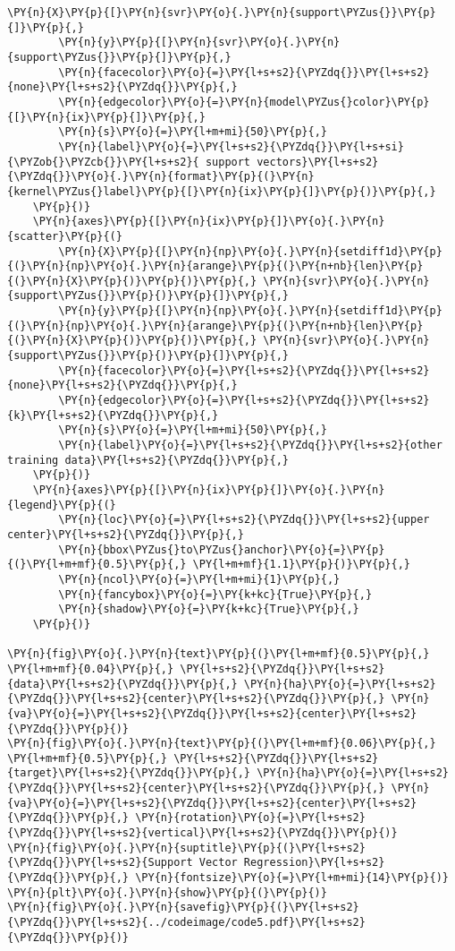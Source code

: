 \begin{Verbatim}[commandchars=\\\{\}]
        \PY{n}{X}\PY{p}{[}\PY{n}{svr}\PY{o}{.}\PY{n}{support\PYZus{}}\PY{p}{]}\PY{p}{,}
        \PY{n}{y}\PY{p}{[}\PY{n}{svr}\PY{o}{.}\PY{n}{support\PYZus{}}\PY{p}{]}\PY{p}{,}
        \PY{n}{facecolor}\PY{o}{=}\PY{l+s+s2}{\PYZdq{}}\PY{l+s+s2}{none}\PY{l+s+s2}{\PYZdq{}}\PY{p}{,}
        \PY{n}{edgecolor}\PY{o}{=}\PY{n}{model\PYZus{}color}\PY{p}{[}\PY{n}{ix}\PY{p}{]}\PY{p}{,}
        \PY{n}{s}\PY{o}{=}\PY{l+m+mi}{50}\PY{p}{,}
        \PY{n}{label}\PY{o}{=}\PY{l+s+s2}{\PYZdq{}}\PY{l+s+si}{\PYZob{}\PYZcb{}}\PY{l+s+s2}{ support vectors}\PY{l+s+s2}{\PYZdq{}}\PY{o}{.}\PY{n}{format}\PY{p}{(}\PY{n}{kernel\PYZus{}label}\PY{p}{[}\PY{n}{ix}\PY{p}{]}\PY{p}{)}\PY{p}{,}
    \PY{p}{)}
    \PY{n}{axes}\PY{p}{[}\PY{n}{ix}\PY{p}{]}\PY{o}{.}\PY{n}{scatter}\PY{p}{(}
        \PY{n}{X}\PY{p}{[}\PY{n}{np}\PY{o}{.}\PY{n}{setdiff1d}\PY{p}{(}\PY{n}{np}\PY{o}{.}\PY{n}{arange}\PY{p}{(}\PY{n+nb}{len}\PY{p}{(}\PY{n}{X}\PY{p}{)}\PY{p}{)}\PY{p}{,} \PY{n}{svr}\PY{o}{.}\PY{n}{support\PYZus{}}\PY{p}{)}\PY{p}{]}\PY{p}{,}
        \PY{n}{y}\PY{p}{[}\PY{n}{np}\PY{o}{.}\PY{n}{setdiff1d}\PY{p}{(}\PY{n}{np}\PY{o}{.}\PY{n}{arange}\PY{p}{(}\PY{n+nb}{len}\PY{p}{(}\PY{n}{X}\PY{p}{)}\PY{p}{)}\PY{p}{,} \PY{n}{svr}\PY{o}{.}\PY{n}{support\PYZus{}}\PY{p}{)}\PY{p}{]}\PY{p}{,}
        \PY{n}{facecolor}\PY{o}{=}\PY{l+s+s2}{\PYZdq{}}\PY{l+s+s2}{none}\PY{l+s+s2}{\PYZdq{}}\PY{p}{,}
        \PY{n}{edgecolor}\PY{o}{=}\PY{l+s+s2}{\PYZdq{}}\PY{l+s+s2}{k}\PY{l+s+s2}{\PYZdq{}}\PY{p}{,}
        \PY{n}{s}\PY{o}{=}\PY{l+m+mi}{50}\PY{p}{,}
        \PY{n}{label}\PY{o}{=}\PY{l+s+s2}{\PYZdq{}}\PY{l+s+s2}{other training data}\PY{l+s+s2}{\PYZdq{}}\PY{p}{,}
    \PY{p}{)}
    \PY{n}{axes}\PY{p}{[}\PY{n}{ix}\PY{p}{]}\PY{o}{.}\PY{n}{legend}\PY{p}{(}
        \PY{n}{loc}\PY{o}{=}\PY{l+s+s2}{\PYZdq{}}\PY{l+s+s2}{upper center}\PY{l+s+s2}{\PYZdq{}}\PY{p}{,}
        \PY{n}{bbox\PYZus{}to\PYZus{}anchor}\PY{o}{=}\PY{p}{(}\PY{l+m+mf}{0.5}\PY{p}{,} \PY{l+m+mf}{1.1}\PY{p}{)}\PY{p}{,}
        \PY{n}{ncol}\PY{o}{=}\PY{l+m+mi}{1}\PY{p}{,}
        \PY{n}{fancybox}\PY{o}{=}\PY{k+kc}{True}\PY{p}{,}
        \PY{n}{shadow}\PY{o}{=}\PY{k+kc}{True}\PY{p}{,}
    \PY{p}{)}

\PY{n}{fig}\PY{o}{.}\PY{n}{text}\PY{p}{(}\PY{l+m+mf}{0.5}\PY{p}{,} \PY{l+m+mf}{0.04}\PY{p}{,} \PY{l+s+s2}{\PYZdq{}}\PY{l+s+s2}{data}\PY{l+s+s2}{\PYZdq{}}\PY{p}{,} \PY{n}{ha}\PY{o}{=}\PY{l+s+s2}{\PYZdq{}}\PY{l+s+s2}{center}\PY{l+s+s2}{\PYZdq{}}\PY{p}{,} \PY{n}{va}\PY{o}{=}\PY{l+s+s2}{\PYZdq{}}\PY{l+s+s2}{center}\PY{l+s+s2}{\PYZdq{}}\PY{p}{)}
\PY{n}{fig}\PY{o}{.}\PY{n}{text}\PY{p}{(}\PY{l+m+mf}{0.06}\PY{p}{,} \PY{l+m+mf}{0.5}\PY{p}{,} \PY{l+s+s2}{\PYZdq{}}\PY{l+s+s2}{target}\PY{l+s+s2}{\PYZdq{}}\PY{p}{,} \PY{n}{ha}\PY{o}{=}\PY{l+s+s2}{\PYZdq{}}\PY{l+s+s2}{center}\PY{l+s+s2}{\PYZdq{}}\PY{p}{,} \PY{n}{va}\PY{o}{=}\PY{l+s+s2}{\PYZdq{}}\PY{l+s+s2}{center}\PY{l+s+s2}{\PYZdq{}}\PY{p}{,} \PY{n}{rotation}\PY{o}{=}\PY{l+s+s2}{\PYZdq{}}\PY{l+s+s2}{vertical}\PY{l+s+s2}{\PYZdq{}}\PY{p}{)}
\PY{n}{fig}\PY{o}{.}\PY{n}{suptitle}\PY{p}{(}\PY{l+s+s2}{\PYZdq{}}\PY{l+s+s2}{Support Vector Regression}\PY{l+s+s2}{\PYZdq{}}\PY{p}{,} \PY{n}{fontsize}\PY{o}{=}\PY{l+m+mi}{14}\PY{p}{)}
\PY{n}{plt}\PY{o}{.}\PY{n}{show}\PY{p}{(}\PY{p}{)}
\PY{n}{fig}\PY{o}{.}\PY{n}{savefig}\PY{p}{(}\PY{l+s+s2}{\PYZdq{}}\PY{l+s+s2}{../codeimage/code5.pdf}\PY{l+s+s2}{\PYZdq{}}\PY{p}{)}
\end{Verbatim}
